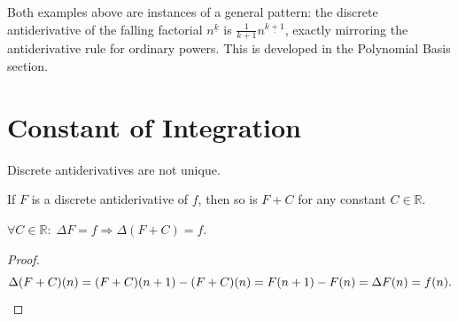 \begin{remark*}
Both examples above are instances of a general pattern: the discrete
antiderivative of the falling factorial \(n^{\underline{k}}\) is
\(\tfrac{1}{k+1}n^{\underline{k+1}}\), exactly mirroring the antiderivative
rule for ordinary powers. This is developed in the Polynomial Basis section.
\end{remark*}

\section*{Constant of Integration}

Discrete antiderivatives are not unique.

\begin{proposition}
\label{prop:constant-of-integration}
If \(F\) is a discrete antiderivative of \(f\), then so is \(F + C\)
for any constant \(C \in \mathbb{R}\).
\end{proposition}

\begin{remark*}
\(\forall C \in \mathbb{R}:\;
\Delta F = f \Rightarrow \Delta(F+C) = f\).
\end{remark*}

\begin{proof}
\[
\Delta(F+C)(n) = (F+C)(n+1) - (F+C)(n)
= F(n+1)-F(n) = \Delta F(n) = f(n). \qedhere
\]
\end{proof}
